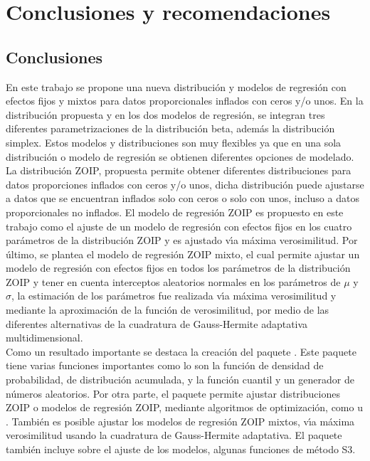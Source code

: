 \chapter{Conclusiones y recomendaciones}\label{cap5}
\section{Conclusiones}

En este trabajo se propone una nueva distribuci\'{o}n y modelos de regresi\'{o}n con efectos fijos y mixtos para datos proporcionales inflados con ceros y/o unos. En la distribuci\'{o}n propuesta y en los dos modelos de regresi\'{o}n, se integran tres diferentes parametrizaciones de la distribuci\'{o}n beta, adem\'{a}s la distribuci\'{o}n simplex. Estos modelos y distribuciones son muy flexibles ya que en una sola distribuci\'{o}n o modelo de regresi\'{o}n se obtienen diferentes opciones de modelado.\\

La distribuci\'{o}n ZOIP, propuesta permite obtener diferentes distribuciones para datos proporciones inflados con ceros y/o unos, dicha distribuci\'{o}n puede ajustarse a datos que se encuentran inflados solo con ceros o solo con unos, incluso a datos proporcionales no inflados. El modelo de regresi\'{o}n ZOIP es propuesto en este trabajo como el ajuste de un modelo de regresi\'{o}n con efectos fijos en los cuatro par\'{a}metros de la distribuci\'{o}n ZOIP y es ajustado v\'{\i}a m\'{a}xima verosimilitud. Por \'{u}ltimo, se plantea el modelo de regresi\'{o}n ZOIP mixto, el cual permite ajustar un modelo de regresi\'{o}n con efectos fijos en todos los par\'{a}metros de la distribuci\'{o}n ZOIP y tener en cuenta interceptos aleatorios normales en los par\'{a}metros de $\mu$ y $\sigma$, la estimaci\'{o}n de los par\'{a}metros fue realizada v\'{\i}a m\'{a}xima verosimilitud y mediante la aproximaci\'{o}n de la funci\'{o}n de verosimilitud, por medio de las diferentes alternativas de la cuadratura de Gauss-Hermite adaptativa multidimensional.\\
 
Como un resultado importante se destaca la creaci\'{o}n del paquete . Este paquete tiene varias funciones importantes como lo son la funci\'{o}n de densidad de probabilidad, de distribuci\'{o}n acumulada, y la funci\'{o}n cuantil y un generador de n\'{u}meros aleatorios. Por otra parte, el paquete permite ajustar distribuciones ZOIP o modelos de regresi\'{o}n ZOIP, mediante algoritmos de optimizaci\'{o}n, como  u . Tambi\'{e}n es posible ajustar los modelos de regresi\'{o}n ZOIP mixtos, v\'{\i}a m\'{a}xima verosimilitud usando la cuadratura de Gauss-Hermite adaptativa. El paquete  tambi\'{e}n incluye sobre el ajuste de los modelos, algunas funciones de m\'{e}todo S3.\\

